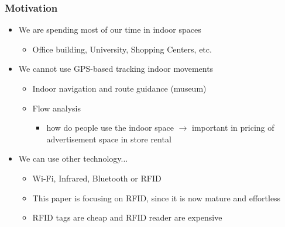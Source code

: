 \documentclass{beamer}
\begin{document}
\begin{frame}
\frametitle{Motivation}
\begin{itemize}
\item We are spending most of our time in indoor spaces
    \begin{itemize}
    \item Office building, University, Shopping Centers, etc.
    \end{itemize}
\item We cannot use GPS-based tracking indoor movements
    \begin{itemize}
    \item Indoor navigation and route guidance (museum)
    \item Flow analysis
        \begin{itemize}
        \item how do people use the indoor space $\rightarrow$ important in pricing of advertisement space in store rental
        \end{itemize}
    \end{itemize}
\item We can use other technology...
    \begin{itemize}
    \item Wi-Fi, Infrared, Bluetooth or RFID
    \item This paper is focusing on RFID, since it is now mature and effortless
    \item RFID tags are cheap and RFID reader are expensive
    \end{itemize}
\end{itemize}

\end{frame}
\end{document}
